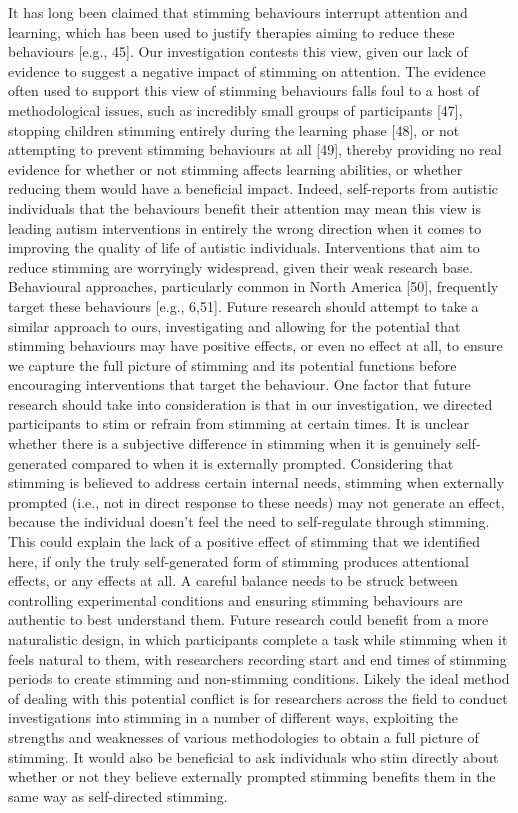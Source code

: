 \documentclass[
  letterpaper,
  DIV=11,
  numbers=noendperiod]{scrartcl}
\begin{document}
It has long been claimed that stimming behaviours interrupt attention
and learning, which has been used to justify therapies aiming to reduce
these behaviours {[}e.g., 45{]}. Our investigation contests this view,
given our lack of evidence to suggest a negative impact of stimming on
attention. The evidence often used to support this view of stimming
behaviours falls foul to a host of methodological issues, such as
incredibly small groups of participants {[}47{]}, stopping children
stimming entirely during the learning phase {[}48{]}, or not attempting
to prevent stimming behaviours at all {[}49{]}, thereby providing no
real evidence for whether or not stimming affects learning abilities, or
whether reducing them would have a beneficial impact. Indeed,
self-reports from autistic individuals that the behaviours benefit their
attention may mean this view is leading autism interventions in entirely
the wrong direction when it comes to improving the quality of life of
autistic individuals. Interventions that aim to reduce stimming are
worryingly widespread, given their weak research base. Behavioural
approaches, particularly common in North America {[}50{]}, frequently
target these behaviours {[}e.g., 6,51{]}. Future research should attempt
to take a similar approach to ours, investigating and allowing for the
potential that stimming behaviours may have positive effects, or even no
effect at all, to ensure we capture the full picture of stimming and its
potential functions before encouraging interventions that target the
behaviour. One factor that future research should take into
consideration is that in our investigation, we directed participants to
stim or refrain from stimming at certain times. It is unclear whether
there is a subjective difference in stimming when it is genuinely
self-generated compared to when it is externally prompted. Considering
that stimming is believed to address certain internal needs, stimming
when externally prompted (i.e., not in direct response to these needs)
may not generate an effect, because the individual doesn't feel the need
to self-regulate through stimming. This could explain the lack of a
positive effect of stimming that we identified here, if only the truly
self-generated form of stimming produces attentional effects, or any
effects at all. A careful balance needs to be struck between controlling
experimental conditions and ensuring stimming behaviours are authentic
to best understand them. Future research could benefit from a more
naturalistic design, in which participants complete a task while
stimming when it feels natural to them, with researchers recording start
and end times of stimming periods to create stimming and non-stimming
conditions. Likely the ideal method of dealing with this potential
conflict is for researchers across the field to conduct investigations
into stimming in a number of different ways, exploiting the strengths
and weaknesses of various methodologies to obtain a full picture of
stimming. It would also be beneficial to ask individuals who stim
directly about whether or not they believe externally prompted stimming
benefits them in the same way as self-directed stimming.
\end{document}
